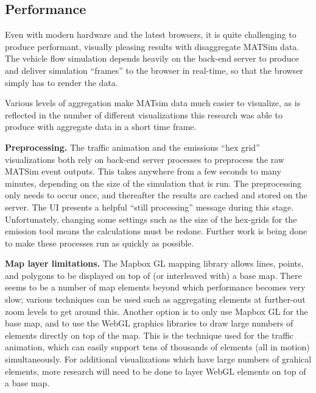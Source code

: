 \hypertarget{mathub-performance}{%
\subsection{Performance}\label{performance}}

Even with modern hardware and the latest browsers, it is quite challenging to produce performant, visually pleasing results with disaggregate MATSim data. The vehicle flow simulation depends heavily on the back-end server to produce and deliver simulation ``frames'' to the browser in real-time, so that the browser simply has to render the data.

Various levels of aggregation make MATsim data much easier to visualize, as is reflected in the number of different visualizations this research was able to produce with aggregate data in a short time frame.

\textbf{Preprocessing.} The traffic animation and the emissions ``hex grid'' visualizations both rely on back-end server processes to preprocess the raw MATSim event outputs. This takes anywhere from a few seconds to many minutes, depending on the size of the simulation that is run. The preprocessing only needs to occur once, and thereafter the results are cached and stored on the server. The UI presents a helpful ``still processing'' message during this stage. Unfortunately, changing some settings such as the size of the hex-grids for the emission tool means the calculations must be redone. Further work is being done to make these processes run as quickly as possible.

\textbf{Map layer limitations.} The Mapbox GL mapping library allows lines, points, and polygons to be displayed on top of (or interleaved with) a base map. There seems to be a number of map elements beyond which performance becomes very slow; various techniques can be used such as aggregating elements at further-out zoom levels to get around this. Another option is to only use Mapbox GL for the base map, and to use the WebGL graphics libraries to draw large numbers of elements directly on top of the map. This is the technique used for the traffic animation, which can easily support tens of thousands of elements (all in motion) simultaneously. For additional visualizations which have large numbers of grahical elements, more research will need to be done to layer WebGL elements on top of a base map.

